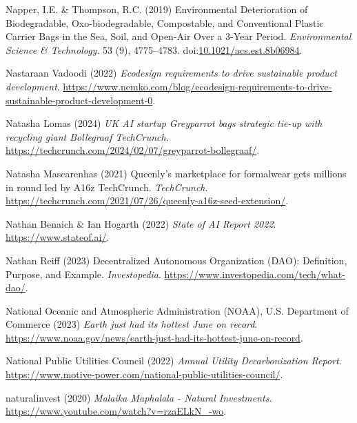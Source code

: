 \documentclass[
  letterpaper,
  DIV=11,
  numbers=noendperiod]{scrartcl}
\newlength{\cslhangindent}
\newenvironment{CSLReferences}[2] %
 {\begin{list}{}{%
  \setlength{\itemindent}{0pt}
  \setlength{\leftmargin}{0pt}
  \setlength{\parsep}{0pt}
  \ifodd #1
   \setlength{\leftmargin}{\cslhangindent}
   \setlength{\itemindent}{-1\cslhangindent}
  \fi
  \setlength{\itemsep}{#2\baselineskip}}}
 {\end{list}}
\begin{document}
\begin{CSLReferences}{0}{1}
Napper, I.E. \& Thompson, R.C. (2019) Environmental {Deterioration} of
{Biodegradable}, {Oxo-biodegradable}, {Compostable}, and {Conventional
Plastic Carrier Bags} in the {Sea}, {Soil}, and {Open-Air Over} a
3-{Year Period}. \emph{Environmental Science \& Technology}. 53 (9),
4775--4783.
doi:\href{https://doi.org/10.1021/acs.est.8b06984}{10.1021/acs.est.8b06984}.

Nastaraan Vadoodi (2022) \emph{Ecodesign requirements to drive
sustainable product development}.
\url{https://www.nemko.com/blog/ecodesign-requirements-to-drive-sustainable-product-development-0}.

Natasha Lomas (2024) \emph{{UK AI} startup {Greyparrot} bags strategic
tie-up with recycling giant {Bollegraaf} {\textbar} {TechCrunch}}.
\url{https://techcrunch.com/2024/02/07/greyparrot-bollegraaf/}.

Natasha Mascarenhas (2021) Queenly's marketplace for formalwear gets
millions in round led by {A16z} {\textbar} {TechCrunch}.
\emph{TechCrunch}.
\url{https://techcrunch.com/2021/07/26/queenly-a16z-seed-extension/}.

Nathan Benaich \& Ian Hogarth (2022) \emph{State of {AI Report} 2022}.
\url{https://www.stateof.ai/}.

Nathan Reiff (2023) Decentralized {Autonomous Organization} ({DAO}):
{Definition}, {Purpose}, and {Example}. \emph{Investopedia}.
\url{https://www.investopedia.com/tech/what-dao/}.

National Oceanic and Atmospheric Administration (NOAA), U.S. Department
of Commerce (2023) \emph{Earth just had its hottest {June} on record}.
\url{https://www.noaa.gov/news/earth-just-had-its-hottest-june-on-record}.

National Public Utilities Council (2022) \emph{Annual {Utility
Decarbonization Report}}.
\url{https://www.motive-power.com/national-public-utilities-council/}.

naturalinvest (2020) \emph{Malaika {Maphalala} - {Natural Investments}}.
\url{https://www.youtube.com/watch?v=rzaELkN_-wo}.


\end{CSLReferences}
\end{document}
